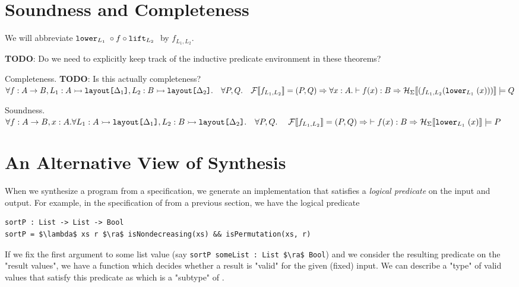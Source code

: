 \documentclass[10pt]{article}
\begin{document}
\section{Soundness and Completeness}

We will abbreviate $\texttt{lower}_{L_1}\; \circ f \circ \texttt{lift}_{L_2}\;$ by $f_{L_1,L_2}$.

\textbf{TODO}: Do we need to explicitly keep track of the inductive predicate environment in these theorems?

\begin{theorem} Completeness. \textbf{TODO}: Is this actually completeness?\\
  $\forall f : A \rightarrow B, L_1 : A \rightarrowtail \textnormal{\texttt{layout[$\Delta_1$]}}, L_2 : B \rightarrowtail \textnormal{\texttt{layout[$\Delta_2$]}}.\\
  ~~~\forall P, Q.\\
  ~~~\mathcal{F}\llbracket f_{L_1,L_2}\rrbracket = (P, Q) \Rightarrow \forall x : A. \vdash f(x) : B \Rightarrow \mathcal{H}_{\Sigma}\llbracket(f_{L_1,L_2}(\texttt{lower}_{L_1}\;(x)))\rrbracket \models Q$
\end{theorem}

\begin{theorem} Soundness.\\
  $\forall f : A \rightarrow B, x : A.\forall L_1 : A \rightarrowtail \textnormal{\texttt{layout[$\Delta_1$]}}, L_2 : B \rightarrowtail \textnormal{\texttt{layout[$\Delta_2$]}}.\\
  ~~~\forall P, Q.\\
  ~~~\; \mathcal{F}\llbracket f_{L_1,L_2}\rrbracket = (P, Q) \Rightarrow\; \vdash f(x) : B \Rightarrow \mathcal{H}_{\Sigma}\llbracket\texttt{lower}_{L_1}\;(x)\rrbracket \models P$
\end{theorem}

\section{An Alternative View of Synthesis}

When we synthesize a program from a specification, we generate an implementation that satisfies a \textit{logical predicate} on the
input and output. For example, in the specification of  from a previous section, we have the logical predicate

\begin{lstlisting}
sortP : List -> List -> Bool
sortP = $\lambda$ xs r $\ra$ isNondecreasing(xs) && isPermutation(xs, r)
\end{lstlisting}

If we fix the first argument to some list value (say \lstinline{sortP someList : List $\ra$ Bool}) and we consider the resulting predicate on the "result values", we have
a function which decides whether a result is "valid" for the given (fixed) input. We can describe a "type" of valid values that satisfy this predicate
as  which is a "subtype" of .
\end{document}
